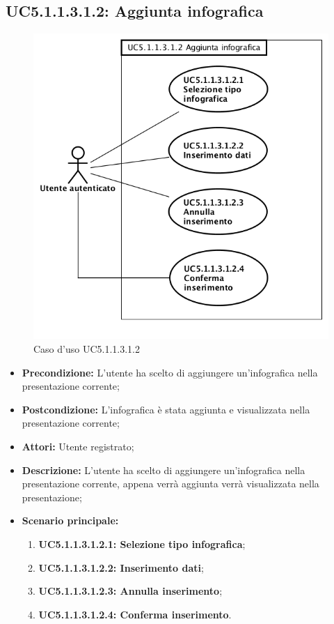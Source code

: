\subsection{ UC5.1.1.3.1.2: Aggiunta infografica}

\begin{figure}[h]
	\begin{center}
	\includegraphics[scale=0.4]{diagram/UC5-1-1-3-1-2.png}
	\caption{Caso d'uso UC5.1.1.3.1.2}
	\end{center}
\end{figure}
\begin{itemize}
	\item \textbf{Precondizione:} L'utente ha scelto di aggiungere un'infografica  nella presentazione corrente;
	\item \textbf{Postcondizione:} L'infografica è stata aggiunta e visualizzata nella presentazione corrente;
	\item \textbf{Attori:} Utente registrato;
	\item \textbf{Descrizione:} L'utente ha scelto di aggiungere un'infografica nella presentazione corrente, appena verrà aggiunta verrà visualizzata nella presentazione;
	\item \textbf{Scenario principale:}
	\begin{enumerate}
		\item \textbf{ UC5.1.1.3.1.2.1: Selezione tipo infografica};
		\item \textbf{ UC5.1.1.3.1.2.2: Inserimento dati};
		\item \textbf{ UC5.1.1.3.1.2.3: Annulla inserimento};
		\item \textbf{ UC5.1.1.3.1.2.4: Conferma inserimento}.
	\end{enumerate}
\end{itemize}
